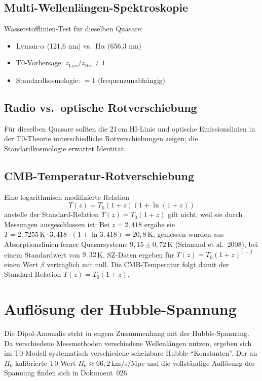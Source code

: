 	\subsection{Multi-Wellenlängen-Spektroskopie}

	Wasserstofflinien-Test für dieselben Quasare:
	\begin{itemize}
		\item Lyman-$\alpha$ (121,6 nm) vs.\ H$\alpha$ (656,3 nm)
		\item T0-Vorhersage: $z_{\mathrm{Ly}\alpha} / z_{\mathrm{H}\alpha} \neq 1$
		\item Standardkosmologie: $= 1$ (frequenzunabhängig)
	\end{itemize}

	\subsection{Radio vs.\ optische Rotverschiebung}
	Für dieselben Quasare sollten die 21\,cm HI-Linie und optische Emissionslinien in der T0-Theorie unterschiedliche Rotverschiebungen zeigen; die Standardkosmologie erwartet Identität.

	\subsection{CMB-Temperatur-Rotverschiebung}
	Eine logarithmisch modifizierte Relation
	$$T(z) = T_0(1+z)(1+\ln(1+z))$$
	anstelle der Standard-Relation $T(z) = T_0(1+z)$ gilt nicht, weil sie durch Messungen ausgeschlossen ist: Bei $z=2{,}418$ ergäbe sie $T=2{,}7255\,\text{K}\cdot 3{,}418\cdot(1+\ln 3{,}418)=20{,}8$\,K, gemessen wurden aus Absorptionslinien ferner Quasarsysteme $9{,}15\pm0{,}72$\,K (Srianand et al.\ 2008), bei einem Standardwert von $9{,}32$\,K. SZ-Daten ergeben für $T(z)=T_0(1+z)^{1-\beta}$ einen Wert $\beta$ verträglich mit null. Die CMB-Temperatur folgt damit der Standard-Relation $T(z) = T_0(1+z)$.

\section{Auflösung der Hubble-Spannung}

	Die Dipol-Anomalie steht in engem Zusammenhang mit der Hubble-Spannung. Da verschiedene Messmethoden verschiedene Wellenlängen nutzen, ergeben sich im T0-Modell systematisch verschiedene scheinbare Hubble-``Konstanten''. Der an $H_0$ kalibrierte T0-Wert $H_0 \approx 66{,}2\,$km/s/Mpc und die vollständige Auflösung der Spannung finden sich in Dokument~026.

